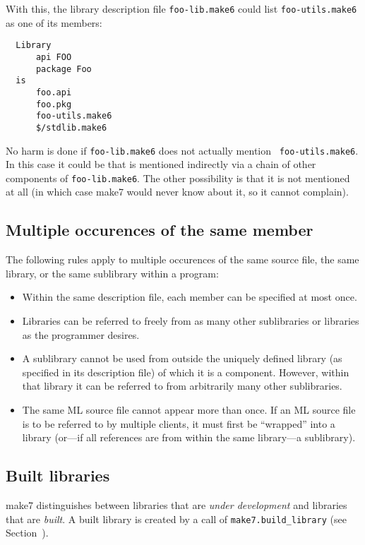 With this, the library description file {\tt foo-lib.make6} could list
{\tt foo-utils.make6} as one of its members:

\begin{verbatim}
  Library
      api FOO
      package Foo
  is
      foo.api
      foo.pkg
      foo-utils.make6
      $/stdlib.make6
\end{verbatim}

No harm is done if {\tt foo-lib.make6} does not actually mention {\tt
foo-utils.make6}.  In this case it could be that is mentioned indirectly via a chain of other components
of {\tt foo-lib.make6}.  The other possibility is that it is not
mentioned at all (in which case make7 would never know about it, so it
cannot complain).

\subsection{Multiple occurences of the same member}
\label{sec:multioccur}

The following rules apply to multiple occurences of the same source
file, the same library, or the same sublibrary within a program:

\begin{itemize}
\item Within the same description file, each member can be specified
at most once.
\item Libraries can be referred to freely from as many other sublibraries or
libraries as the programmer desires.
\item A sublibrary cannot be used from outside the uniquely defined library
(as specified in its description file) of which it is a component.
However, within that library it can be referred to from arbitrarily
many other sublibraries.
\item The same ML source file cannot appear more than once.  If an ML
source file is to be referred to by multiple clients, it must first be
``wrapped'' into a library (or---if all references are from within the
same library---a sublibrary).
\end{itemize}

\subsection{Built libraries}
\label{sec:built}

make7 distinguishes between libraries that are {\em under development}
and libraries that are {\em built}.  A built library is created by a
call of {\tt make7.build_library} (see Section~).

